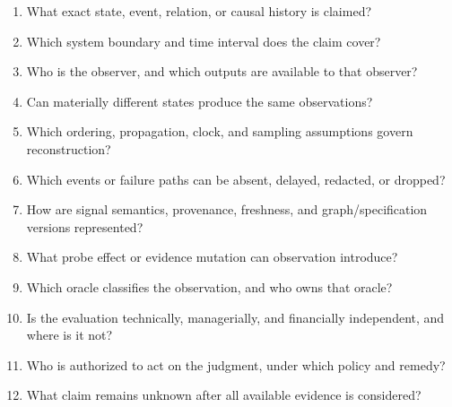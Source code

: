 \documentclass[10pt,a4paper]{article}
\begin{document}
\begin{enumerate}
  \item What exact state, event, relation, or causal history is claimed?
  \item Which system boundary and time interval does the claim cover?
  \item Who is the observer, and which outputs are available to that observer?
  \item Can materially different states produce the same observations?
  \item Which ordering, propagation, clock, and sampling assumptions govern reconstruction?
  \item Which events or failure paths can be absent, delayed, redacted, or dropped?
  \item How are signal semantics, provenance, freshness, and graph/specification versions represented?
  \item What probe effect or evidence mutation can observation introduce?
  \item Which oracle classifies the observation, and who owns that oracle?
  \item Is the evaluation technically, managerially, and financially independent, and where is it not?
  \item Who is authorized to act on the judgment, under which policy and remedy?
  \item What claim remains unknown after all available evidence is considered?
\end{enumerate}
\end{document}
